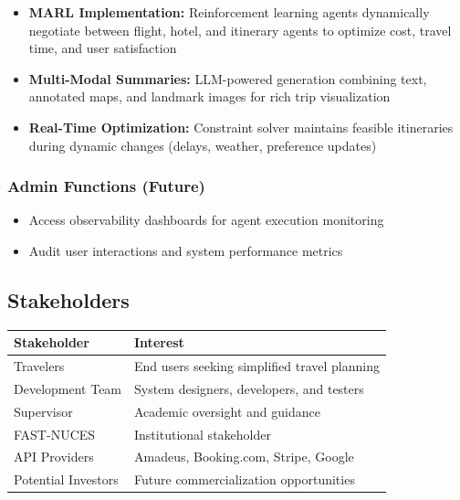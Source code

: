 \documentclass[12pt,a4paper]{article}
\begin{document}
\begin{itemize}[leftmargin=*, itemsep=0.3em]
    \item \textbf{MARL Implementation:} Reinforcement learning agents dynamically negotiate between flight, hotel, and itinerary agents to optimize cost, travel time, and user satisfaction
    \item \textbf{Multi-Modal Summaries:} LLM-powered generation combining text, annotated maps, and landmark images for rich trip visualization
    \item \textbf{Real-Time Optimization:} Constraint solver maintains feasible itineraries during dynamic changes (delays, weather, preference updates)
\end{itemize}

\subsubsection{Admin Functions (Future)}

\begin{itemize}[leftmargin=*, itemsep=0.3em]
    \item Access observability dashboards for agent execution monitoring
    \item Audit user interactions and system performance metrics
\end{itemize}

\subsection{Stakeholders}

\begin{table}[htbp]
\centering
\begin{tabular}{L{4cm}L{9cm}}
    \toprule
    \textbf{Stakeholder} & \textbf{Interest} \\
    \midrule
    Travelers & End users seeking simplified travel planning \\
    Development Team & System designers, developers, and testers \\
    Supervisor & Academic oversight and guidance \\
    FAST-NUCES & Institutional stakeholder \\
    API Providers & Amadeus, Booking.com, Stripe, Google \\
    Potential Investors & Future commercialization opportunities \\
    \bottomrule
\end{tabular}
\end{table}
\end{document}
